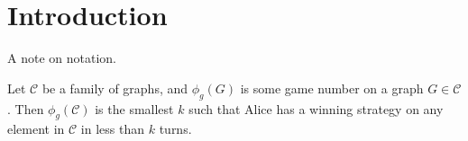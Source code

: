 \chapter{Introduction}
A note on notation.

    Let $\mathcal{C}$ be a family of graphs, and $\phi_g(G)$ is some game number on a graph $G \in \mathcal{C}$. Then $\phi_g(\mathcal{C})$ is the smallest $k$ such that Alice has a winning strategy on any element in $\mathcal{C}$ in less than $k$ turns.
    
    